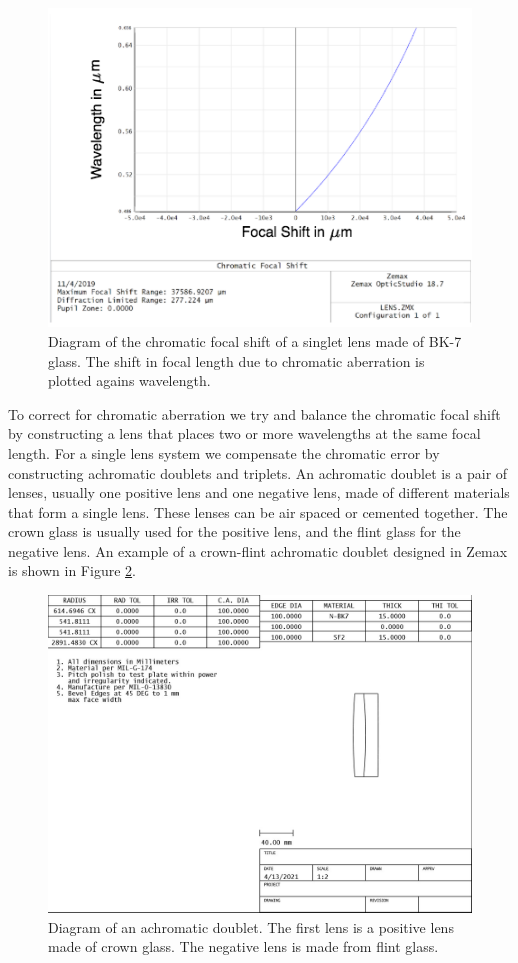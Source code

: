 \begin{figure}
    \centering
    \includegraphics[width=.7\textwidth]{Chapter Materials/Chapter Three Materials/focalshift.png}
    \caption{Diagram of the chromatic focal shift of a singlet lens made of BK-7 glass. The shift in focal length due to chromatic aberration is plotted agains wavelength.}
    \label{fig:focalshift}
\end{figure}

To correct for chromatic aberration we try and balance the chromatic focal shift by constructing a lens that places two or more wavelengths at the same focal length. For a single lens system we compensate the chromatic error by constructing achromatic doublets and triplets. An achromatic doublet is a pair of lenses, usually one positive lens and one negative lens, made of different materials that form a single lens. These lenses can be air spaced or cemented together. The crown glass is usually used for the positive lens, and the flint glass for the negative lens. An example of a crown-flint achromatic doublet designed in Zemax is shown in Figure \ref{fig:crownflint}.

\begin{figure}
    \centering
    \includegraphics[width=.8\textwidth]{Chapter Materials/Chapter Three Materials/doublet.jpg}
    \caption{Diagram of an achromatic doublet. The first lens is a positive lens made of crown glass. The negative lens is made from flint glass. }
    \label{fig:crownflint}
\end{figure}

